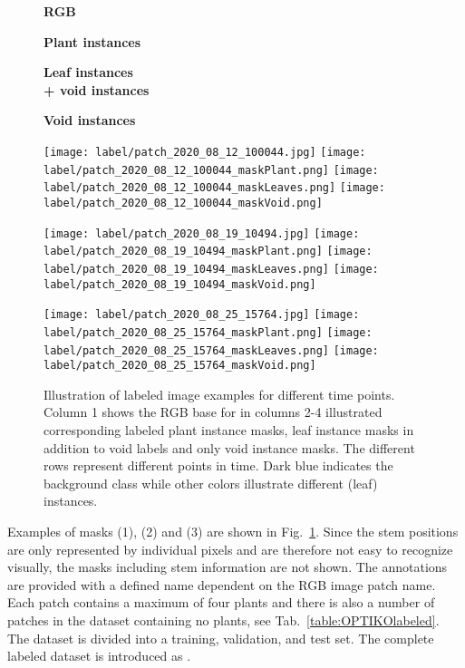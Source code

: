 \documentclass{article}
\def\figref#1{Fig.~\ref{#1}}
\def\tabref#1{Tab.~\ref{#1}}
\begin{document}
 
\begin{figure}[t]
	\centering
	 \begin{minipage}{0.24\textwidth}
	 \centering
	 \textbf{RGB}
	 \end{minipage}
	 \begin{minipage}{0.24\textwidth}
	 	 \centering
	 \textbf{Plant instances}
	 \end{minipage}
	 \begin{minipage}{0.24\textwidth}
	 	 \centering
	 \textbf{Leaf instances \\ + void instances}
	 \end{minipage}
	  \begin{minipage}{0.24\textwidth}
	 	 \centering
	 \textbf{Void instances}
	 \end{minipage}

    \vspace{6pt}
    \texttt{[image: label/patch\_2020\_08\_12\_100044.jpg]} 
    \texttt{[image: label/patch\_2020\_08\_12\_100044\_maskPlant.png]}
    \texttt{[image: label/patch\_2020\_08\_12\_100044\_maskLeaves.png]} 
     \texttt{[image: label/patch\_2020\_08\_12\_100044\_maskVoid.png]}

    \texttt{[image: label/patch\_2020\_08\_19\_10494.jpg]} 
    \texttt{[image: label/patch\_2020\_08\_19\_10494\_maskPlant.png]}
    \texttt{[image: label/patch\_2020\_08\_19\_10494\_maskLeaves.png]} 
     \texttt{[image: label/patch\_2020\_08\_19\_10494\_maskVoid.png]}

    \texttt{[image: label/patch\_2020\_08\_25\_15764.jpg]} 
    \texttt{[image: label/patch\_2020\_08\_25\_15764\_maskPlant.png]}
    \texttt{[image: label/patch\_2020\_08\_25\_15764\_maskLeaves.png]} 
     \texttt{[image: label/patch\_2020\_08\_25\_15764\_maskVoid.png]}

 	\caption{Illustration of labeled image examples for different time points. Column 1 shows the RGB base for in columns 2-4 illustrated corresponding labeled plant instance masks, leaf instance masks in addition to void labels and only void instance masks. The different rows represent different points in time. Dark blue indicates the background class while other colors illustrate different (leaf) instances.}
	\label{fig:rgb_label_image}
\end{figure} 

Examples of masks (1), (2) and (3) are shown in \figref{fig:rgb_label_image}.
Since the stem positions are only represented by individual pixels and are therefore not easy to recognize visually, the masks including stem information are not shown.
The annotations are provided with a defined name dependent on the RGB image patch name. Each patch contains a maximum of four plants and there is also a number of patches in the dataset containing no plants, see \tabref{table:OPTIKOlabeled}. The dataset is divided into a training, validation, and test set. The complete labeled dataset is introduced as .
\end{document}
